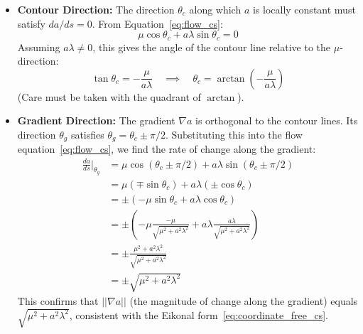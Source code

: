 \documentclass[12pt]{article}
\begin{document}
\begin{itemize}
    \item \textbf{Contour Direction:} The direction \( \theta_c \) along which \( a \) is locally constant must satisfy \( da/ds = 0 \). From Equation~\eqref{eq:flow_cs}:
      \[ \mu \cos \theta_c + a \lambda \sin \theta_c = 0 \]
      Assuming \( a\lambda \neq 0 \), this gives the angle of the contour line relative to the \( \mu \)-direction:
      \begin{equation}
          \tan \theta_c = - \frac{\mu}{a \lambda} \quad \implies \quad \theta_c = \arctan \left( - \frac{\mu}{a \lambda} \right) \label{eq:contourangle_cs}
      \end{equation}
      (Care must be taken with the quadrant of \( \arctan \)).

    \item \textbf{Gradient Direction:} The gradient \( \nabla a \) is orthogonal to the contour lines. Its direction \( \theta_g \) satisfies \( \theta_g = \theta_c \pm \pi/2 \). Substituting this into the flow equation~\eqref{eq:flow_cs}, we find the rate of change along the gradient:
      \begin{align}
          \frac{da}{ds}\bigg|_{\theta_g} &= \mu \cos(\theta_c \pm \pi/2) + a \lambda \sin(\theta_c \pm \pi/2) \nonumber \\
          &= \mu (\mp \sin \theta_c) + a \lambda (\pm \cos \theta_c) \nonumber \\
          &= \pm ( - \mu \sin \theta_c + a \lambda \cos \theta_c ) \nonumber \\
          &= \pm \left( - \mu \frac{-\mu}{\sqrt{\mu^2+a^2\lambda^2}} + a \lambda \frac{a \lambda}{\sqrt{\mu^2+a^2\lambda^2}} \right) \nonumber \\
          &= \pm \frac{\mu^2 + a^2 \lambda^2}{\sqrt{\mu^2+a^2\lambda^2}} \nonumber \\
          &= \pm \sqrt{\mu^2 + a^2 \lambda^2} \label{eq:grad_cs}
      \end{align}
      This confirms that \( ||\nabla a|| \) (the magnitude of change along the gradient) equals \( \sqrt{\mu^2 + a^2 \lambda^2} \), consistent with the Eikonal form~\eqref{eq:coordinate_free_cs}.
\end{itemize}
\end{document}
